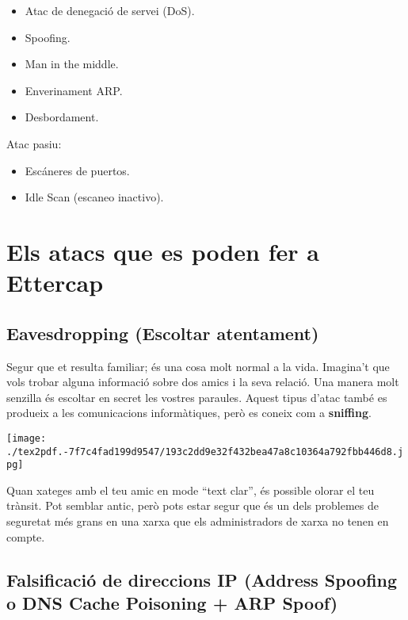 \documentclass[]{article}
\begin{document}
\begin{itemize}
\item
  Atac de denegació de servei (DoS).
\item
  Spoofing.
\item
  Man in the middle.
\item
  Enverinament ARP.
\item
  Desbordament.
\end{itemize}

Atac pasiu:

\begin{itemize}
\item
  Escáneres de puertos.
\item
  Idle Scan (escaneo inactivo).
\end{itemize}

\hypertarget{els-atacs-que-es-poden-fer-a-ettercap}{%
\section{\texorpdfstring{\textbf{Els atacs que es poden fer a
Ettercap}}{Els atacs que es poden fer a Ettercap}}\label{els-atacs-que-es-poden-fer-a-ettercap}}

\hypertarget{eavesdropping-escoltar-atentament}{%
\subsection{\texorpdfstring{\textbf{Eavesdropping (Escoltar
atentament)}}{Eavesdropping (Escoltar atentament)}}\label{eavesdropping-escoltar-atentament}}

Segur que et resulta familiar; és una cosa molt normal a la vida.
Imagina't que vols trobar alguna informació sobre dos amics i la seva
relació. Una manera molt senzilla és escoltar en secret les vostres
paraules. Aquest tipus d'atac també es produeix a les comunicacions
informàtiques, però es coneix com a \textbf{sniffing}.

\texttt{[image: ./tex2pdf.-7f7c4fad199d9547/193c2dd9e32f432bea47a8c10364a792fbb446d8.jpg]}

Quan xateges amb el teu amic en mode ``text clar'', és possible olorar
el teu trànsit. Pot semblar antic, però pots estar segur que és un dels
problemes de seguretat més grans en una xarxa que els administradors de
xarxa no tenen en compte.

\hypertarget{falsificaciuxf3-de-direccions-ip-address-spoofing-o-dns-cache-poisoning-arp-spoof}{%
\subsection{\texorpdfstring{\textbf{Falsificació de direccions IP
(Address Spoofing o DNS Cache Poisoning + ARP
Spoof)}}{Falsificació de direccions IP (Address Spoofing o DNS Cache Poisoning + ARP Spoof)}}\label{falsificaciuxf3-de-direccions-ip-address-spoofing-o-dns-cache-poisoning-arp-spoof}}
\end{document}
